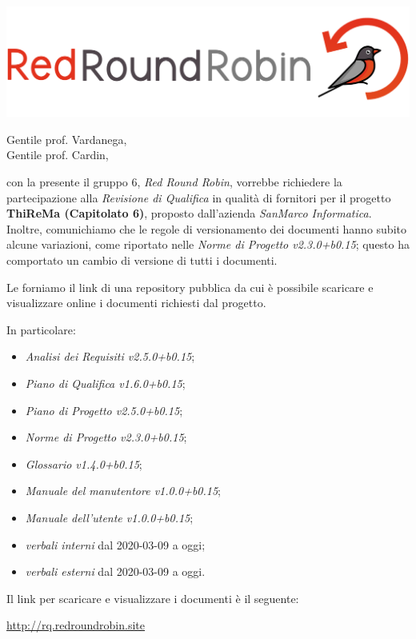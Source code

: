 \documentclass[12pt]{letter}
\date{13 aprile 2020}
\begin{document}
\begin{letter}{ }

\includegraphics[scale=0.17]{images/logo.png}

\opening{Gentile prof. Vardanega,\\ Gentile prof. Cardin, }

con la presente il gruppo 6, \textit{Red Round Robin}, vorrebbe richiedere la partecipazione alla \textit{Revisione di Qualifica} in qualità di fornitori per il progetto \textbf{ThiReMa (Capitolato 6)}, proposto dall'azienda \textit{SanMarco Informatica}.
\newline
Inoltre, comunichiamo che le regole di versionamento dei documenti hanno subito alcune variazioni, come riportato nelle \textit{Norme di Progetto v2.3.0+b0.15}; questo ha comportato un cambio di versione di tutti i documenti.

Le forniamo il link di una repository pubblica da cui è possibile scaricare e visualizzare online i documenti richiesti dal progetto.

In particolare:

\begin{itemize}
  \item \textit{Analisi dei Requisiti v2.5.0+b0.15};
	\item \textit{Piano di Qualifica v1.6.0+b0.15};
	\item \textit{Piano di Progetto v2.5.0+b0.15};
	\item \textit{Norme di Progetto v2.3.0+b0.15};
	\item \textit{Glossario v1.4.0+b0.15};
	\item \textit{Manuale del manutentore v1.0.0+b0.15};
	\item \textit{Manuale dell'utente v1.0.0+b0.15};
	\item \textit{verbali interni} dal 2020-03-09 a oggi;
	\item \textit{verbali esterni} dal 2020-03-09 a oggi.
\end{itemize}

Il link per scaricare e visualizzare i documenti è il seguente:

\begin{center}
\href{https://drive.google.com/drive/folders/1iKZ3SAwq-iA_hfYzytVylcceP-fwv8xA?usp=sharing}{http://rq.redroundrobin.site}
\end{center}


\end{letter}
\end{document}
